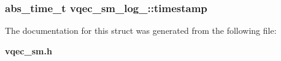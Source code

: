 \subsubsection{\setlength{\rightskip}{0pt plus 5cm}abs\_\-time\_\-t \bf{vqec\_\-sm\_\-log\_\-::timestamp}}\label{structvqec__sm__log___632b4896aacce3530cd964017e3b1dfb}




The documentation for this struct was generated from the following file:\begin{CompactItemize}
\item 
\bf{vqec\_\-sm.h}\end{CompactItemize}

